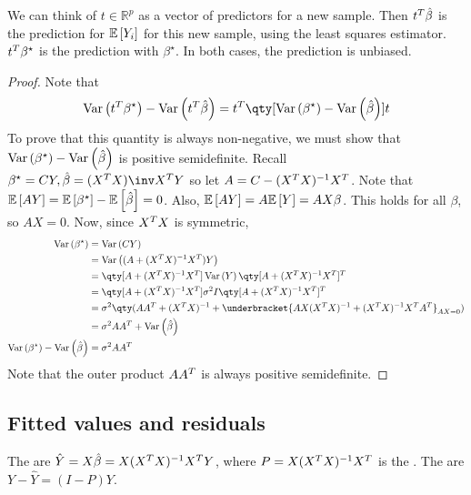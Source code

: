 \begin{remark}
	We can think of $t \in \mathbb R^p$ as a vector of predictors for a new sample.
	Then $t^T \hat \beta$ is the prediction for $\mathbb{E}\left[{Y_i}\right]$ for this new sample, using the least squares estimator.
	$t^T \beta^\star$ is the prediction with $\beta^\star$.
	In both cases, the prediction is unbiased.
\end{remark}

\begin{proof}
	Note that
	\begin{align*}
		\Var{t^\tran \beta^\star} - \Var{t^\tran \hat \beta} = t^\tran \qty[\Var{\beta^\star} - \Var{\hat\beta}] t
	\end{align*}
	To prove that this quantity is always non-negative, we must show that $\operatorname{Var}\left({\beta^\star}\right) - \operatorname{Var}\left({\hat\beta}\right)$ is positive semidefinite.
	Recall $\beta^\star = CY, \hat{\beta} = (X^\tran X)\inv X^\tran Y$ so let $A = C - (X^T X)^{-1} X^T$.
	Note that $\mathbb{E}\left[{AY}\right] = \mathbb{E}\left[{\beta^\star}\right] - \mathbb{E}\left[{\hat\beta}\right] = 0$.
	Also, $\mathbb{E}\left[{AY}\right] = A \mathbb{E}\left[{Y}\right] = AX\beta$.
	This holds for all $\beta$, so $AX = 0$.
	Now, since $X^T X$ is symmetric,
	\begin{align*}
		\Var{\beta^\star} & = \Var{CY} \\
		& = \Var{(A+(X^\tran X)^{-1} X^\tran)Y} \\
		& = \qty[A+(X^\tran X)^{-1} X^\tran] \Var Y \qty[A+(X^\tran X)^{-1} X^\tran]^\tran \\
		& = \qty[A+(X^\tran X)^{-1} X^\tran] \sigma^2 I \qty[A+(X^\tran X)^{-1} X^\tran]^\tran \\
		& = \sigma^2 \qty(A A^\tran + (X^\tran X)^{-1} + \underbracket{AX(X^\tran X)^{-1} + (X^\tran X)^{-1} X^\tran A^\tran}_{AX = 0}) \\
		& = \sigma^2 AA^\tran + \Var{\hat \beta} \\
		\Var{\beta^\star} - \Var{\hat\beta} & = \sigma^2 AA^\tran
	\end{align*}
	Note that the outer product $A A^T$ is always positive semidefinite.
\end{proof}

\subsection{Fitted values and residuals}
\begin{definition}
	The  are $\hat Y = X \hat \beta = X(X^T X)^{-1} X^T Y$, where $P = X (X^T X)^{-1} X^T$ is the .
	The  are $Y - \hat Y = (I-P)Y$.
\end{definition}

